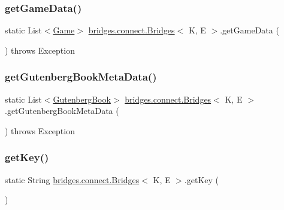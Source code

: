 \subsubsection{\texorpdfstring{get\+Game\+Data()}{getGameData()}}
{\footnotesize\ttfamily static List$<$\hyperlink{classbridges_1_1data__src__dependent_1_1_game}{Game}$>$ \hyperlink{classbridges_1_1connect_1_1_bridges}{bridges.\+connect.\+Bridges}$<$ K, E $>$.get\+Game\+Data (\begin{DoxyParamCaption}{ }\end{DoxyParamCaption}) throws Exception\hspace{0.3cm}{\ttfamily [static]}}

\hypertarget{classbridges_1_1connect_1_1_bridges_a123d445316be7e9927b5642a3b8c71ba}{}\label{classbridges_1_1connect_1_1_bridges_a123d445316be7e9927b5642a3b8c71ba} 
\subsubsection{\texorpdfstring{get\+Gutenberg\+Book\+Meta\+Data()}{getGutenbergBookMetaData()}}
{\footnotesize\ttfamily static List$<$\hyperlink{classbridges_1_1data__src__dependent_1_1_gutenberg_book}{Gutenberg\+Book}$>$ \hyperlink{classbridges_1_1connect_1_1_bridges}{bridges.\+connect.\+Bridges}$<$ K, E $>$.get\+Gutenberg\+Book\+Meta\+Data (\begin{DoxyParamCaption}{ }\end{DoxyParamCaption}) throws Exception\hspace{0.3cm}{\ttfamily [static]}}

\hypertarget{classbridges_1_1connect_1_1_bridges_a813a1783f7b547fdb964f8af87c66f4b}{}\label{classbridges_1_1connect_1_1_bridges_a813a1783f7b547fdb964f8af87c66f4b} 
\subsubsection{\texorpdfstring{get\+Key()}{getKey()}}
{\footnotesize\ttfamily static String \hyperlink{classbridges_1_1connect_1_1_bridges}{bridges.\+connect.\+Bridges}$<$ K, E $>$.get\+Key (\begin{DoxyParamCaption}{ }\end{DoxyParamCaption})\hspace{0.3cm}{\ttfamily [static]}}

